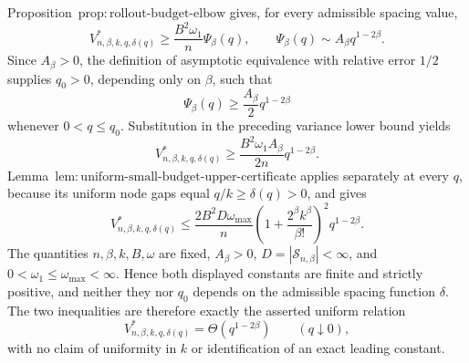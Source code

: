 Proposition~\(\mathrm{prop{:}rollout\text{-}budget\text{-}elbow}\) gives, for every admissible spacing value,
\[
V^*_{n,\beta,k,q,\delta(q)}
\ge \frac{B^2\omega_1}{n}\Psi_\beta(q),
\qquad
\Psi_\beta(q)\sim A_\beta q^{1-2\beta}.
\]
Since \(A_\beta>0\), the definition of asymptotic equivalence with relative error \(1/2\) supplies \(q_0>0\), depending only on \(\beta\), such that
\[
\Psi_\beta(q)\ge \frac{A_\beta}{2}q^{1-2\beta}
\]
whenever \(0<q\le q_0\).  Substitution in the preceding variance lower bound yields
\[
V^*_{n,\beta,k,q,\delta(q)}
\ge \frac{B^2\omega_1A_\beta}{2n}q^{1-2\beta}.
\]
Lemma~\(\mathrm{lem{:}uniform\text{-}small\text{-}budget\text{-}upper\text{-}certificate}\) applies separately at every \(q\), because its uniform node gaps equal \(q/k\ge\delta(q)>0\), and gives
\[
V^*_{n,\beta,k,q,\delta(q)}
\le \frac{2B^2D\omega_{\max}}{n}
\left(1+\frac{2^\beta k^\beta}{\beta!}\right)^2q^{1-2\beta}.
\]
The quantities \(n,\beta,k,B,\omega\) are fixed, \(A_\beta>0\), \(D=|\mathcal S_{n,\beta}|<\infty\), and \(0<\omega_1\le\omega_{\max}<\infty\).  Hence both displayed constants are finite and strictly positive, and neither they nor \(q_0\) depends on the admissible spacing function \(\delta\).  The two inequalities are therefore exactly the asserted uniform relation
\[
V^*_{n,\beta,k,q,\delta(q)}=\Theta\!\left(q^{1-2\beta}\right)
\qquad(q\downarrow0),
\]
with no claim of uniformity in \(k\) or identification of an exact leading constant.